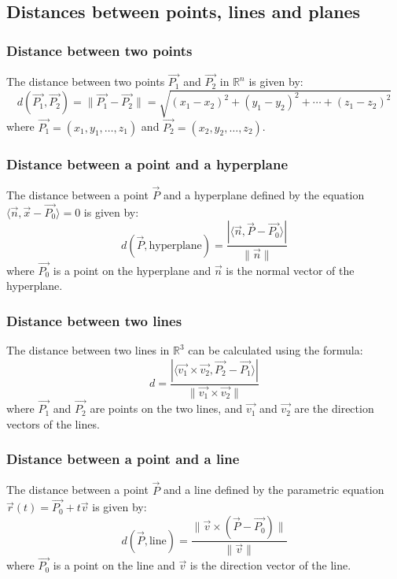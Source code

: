 \subsection{Distances between points, lines and planes}

\subsubsection{Distance between two points}

The distance between two points \(\vec{P_1}\) and \(\vec{P_2}\) in \(\mathbb{R}^n\) is given by:
\[
	d(\vec{P_1}, \vec{P_2}) = \|\vec{P_1} - \vec{P_2}\| = \sqrt{{(x_1 - x_2)}^2 + {(y_1 - y_2)}^2 + \cdots + {(z_1 - z_2)}^2}
\]
where \(\vec{P_1} = (x_1, y_1, \dots,z_1)\) and \(\vec{P_2} = (x_2, y_2, \dots,z_2)\).

\subsubsection{Distance between a point and a hyperplane}

The distance between a point \(\vec{P}\) and a hyperplane defined by the equation \(\langle \vec{n}, \vec{x} - \vec{P_0} \rangle = 0\) is given by:
\[
	d(\vec{P}, \text{hyperplane}) = \frac{|\langle \vec{n}, \vec{P} - \vec{P_0} \rangle|}{\|\vec{n}\|}
\]
where \(\vec{P_0}\) is a point on the hyperplane and \(\vec{n}\) is the normal vector of the hyperplane.

\subsubsection{Distance between two lines}

The distance between two lines in \(\mathbb{R}^3\) can be calculated using the formula:
\[
	d = \frac{|\langle \vec{v_1} \times \vec{v_2}, \vec{P_2} - \vec{P_1} \rangle|}{\|\vec{v_1} \times \vec{v_2}\|}
\]
where \(\vec{P_1}\) and \(\vec{P_2}\) are points on the two lines, and \(\vec{v_1}\) and \(\vec{v_2}\) are the direction vectors of the lines.

\subsubsection{Distance between a point and a line}

The distance between a point \(\vec{P}\) and a line defined by the parametric equation \(\vec{r}(t) = \vec{P_0} + t\vec{v}\) is given by:
\[
	d(\vec{P}, \text{line}) = \frac{\|\vec{v} \times (\vec{P} - \vec{P_0})\|}{\|\vec{v}\|}
\]
where \(\vec{P_0}\) is a point on the line and \(\vec{v}\) is the direction vector of the line.

